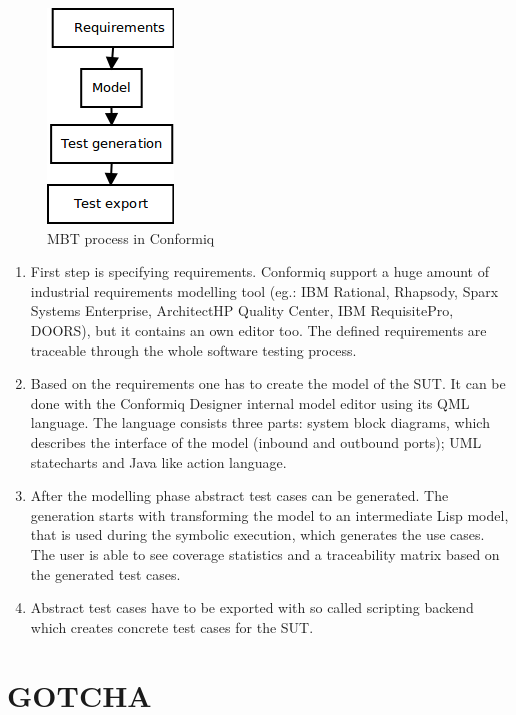 \begin{figure}[htp]
\centering
\includegraphics[scale=0.6]{figures/conformiq_process.png}
\caption{MBT process in Conformiq}
\label{fig:conformiq_process}
\end{figure}

\begin{enumerate}
	\item First step is specifying requirements. Conformiq support a huge amount of industrial requirements modelling tool (eg.: IBM Rational, Rhapsody, Sparx Systems Enterprise, ArchitectHP Quality Center, IBM RequisitePro, DOORS), but it contains an own editor too. The defined requirements are traceable through the whole software testing process.
	\item Based on the requirements one has to create the model of the SUT. It can be done with the Conformiq Designer internal model editor using its QML language. The language consists three parts: system block diagrams, which describes the interface of the model (inbound and outbound ports); UML statecharts and Java like action language.
	\item After the modelling phase abstract test cases can be generated. The generation starts with transforming the model to an intermediate Lisp model, that is used during the symbolic execution, which generates the use cases. The user is able to see coverage statistics and a traceability matrix based on the generated test cases.
	\item Abstract test cases have to be exported with so called scripting backend which creates concrete test cases for the SUT.
\end{enumerate}


\section{GOTCHA}
\label{sec:gotcha}

